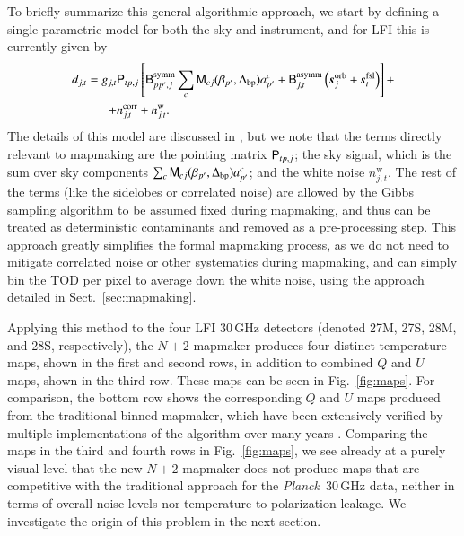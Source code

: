 \documentclass{aa}
\def\Planck{\textit{Planck}}
\begin{document}
To briefly summarize this general algorithmic approach, we start by defining a single parametric model for both the sky and instrument, and for LFI this is currently given by
\begin{equation}
  \begin{split}
    d_{j,t} = g_{j,t}&\mathsf{P}_{tp,j}\left[\mathsf{B}^{\mathrm{symm}}_{pp',j}\sum_{c}
      \mathsf{M}_{cj}(\beta_{p'}, \Delta_{\mathrm{bp}})a^c_{p'}  + \mathsf{B}^{\mathrm{asymm}}_{j,t}\left(\boldsymbol{s}^{\mathrm{orb}}_{j}  
      + \boldsymbol{s}^{\mathrm{fsl}}_{t}\right)\right] + \\
    + &n^{\mathrm{corr}}_{j,t} + n^{\mathrm{w}}_{j,t}.
  \end{split}
  \label{eq:todmodel}
\end{equation}
The details of this model are discussed in \citep{bp01}, but we note that the terms directly relevant to mapmaking are the pointing matrix $\mathsf{P}_{tp,j}$; the sky signal, which is the sum over sky components $\sum_{c} \mathsf{M}_{cj}(\beta_{p'}, \Delta_{\mathrm{bp}})a^c_{p'}$; and the white noise $n^{\mathrm{w}}_{j,t}$. The rest of the terms (like the sidelobes or correlated noise) are allowed by the Gibbs sampling algorithm \citep{gibbs} to be assumed fixed during mapmaking, and thus can be treated as deterministic contaminants and removed as a pre-processing step. This approach greatly simplifies the formal mapmaking process, as we do not need to mitigate correlated noise or other systematics during mapmaking, and can simply bin the TOD per pixel to average down the white noise, using the approach detailed in Sect.~\ref{sec:mapmaking}.

Applying this method to the four LFI 30\,GHz detectors (denoted 27M, 27S, 28M, and 28S, respectively), the $N+2$ mapmaker produces four distinct temperature maps, shown in the first and second rows, in addition to combined $Q$ and $U$ maps, shown in the third row. These maps can be seen in Fig.~\ref{fig:maps}. For comparison, the bottom row shows the corresponding $Q$ and $U$ maps produced from the traditional binned mapmaker, which have been extensively verified by multiple implementations of the algorithm over many years \citep[e.g.,][]{lfi2013,lfi2015,lfi2018}. Comparing the maps in the third and fourth rows in Fig.~\ref{fig:maps}, we see already at a purely visual level that the new $N+2$ mapmaker does not produce maps that are competitive with the traditional approach for the \Planck\ 30\,GHz data, neither in terms of overall noise levels nor temperature-to-polarization leakage. We investigate the origin of this problem in the next section.
\end{document}
